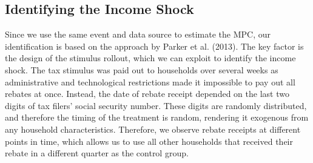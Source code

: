 \subsection{Identifying the Income Shock} \label{subsec:identification}
Since we use the same event and data source to estimate the MPC, our identification is based on the approach by Parker et al. (2013). The key factor is the design of the stimulus rollout, which we can exploit to identify the income shock. The tax stimulus was paid out to households over several weeks as administrative and technological restrictions made it impossible to pay out all rebates at once. Instead, the date of rebate receipt depended on the last two digits of tax filers' social security number. These digits are randomly distributed, and therefore the timing of the treatment is random, rendering it exogenous from any household characteristics. Therefore, we observe rebate receipts at different points in time, which allows us to use all other households that received their rebate in a different quarter as the control group. \\
